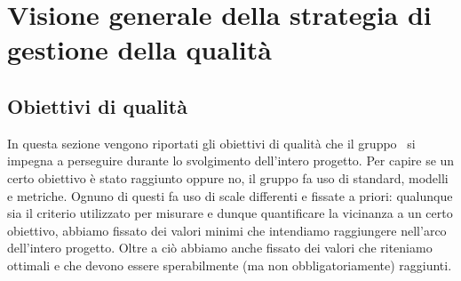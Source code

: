 \documentclass[../PianoDiQualifica.tex]{subfiles}
\begin{document}
\section{Visione generale della strategia di gestione della qualità}
	\subsection{Obiettivi di qualità}
	In questa sezione vengono riportati gli obiettivi di qualità che il gruppo \leaf\ si impegna a perseguire durante lo svolgimento dell'intero progetto. Per capire se un certo obiettivo è stato raggiunto oppure no, il gruppo fa uso di standard, modelli e metriche. Ognuno di questi fa uso di scale differenti e fissate a priori: qualunque sia il criterio utilizzato per misurare e dunque quantificare la vicinanza a un certo obiettivo, abbiamo fissato dei valori minimi che intendiamo raggiungere nell'arco dell'intero progetto. Oltre a ciò abbiamo anche fissato dei valori che riteniamo ottimali e che devono essere sperabilmente (ma non obbligatoriamente) raggiunti.
\end{document}
